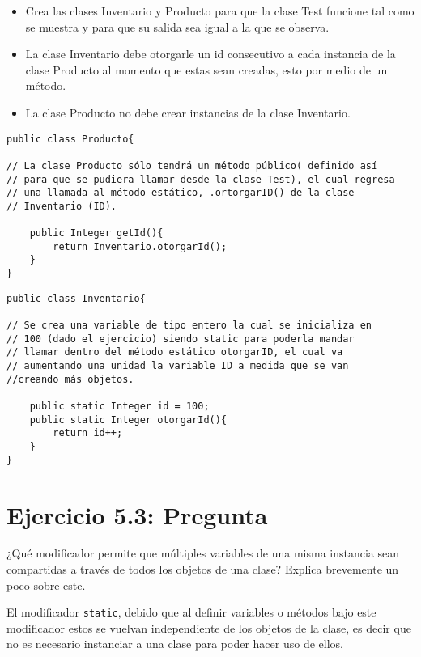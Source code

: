 \documentclass[11pt, oneside]{article}
\begin{document}
\begin{itemize}
	\item Crea las clases Inventario y Producto para que la clase Test funcione tal como se
muestra y para que su salida sea igual a la que se observa.
	\item La clase Inventario debe otorgarle un id consecutivo a cada instancia de la clase
Producto al momento que estas sean creadas, esto por medio de un método.
	\item La clase Producto no debe crear instancias de la clase Inventario.
\end{itemize}


\begin{verbatim}
public class Producto{

// La clase Producto sólo tendrá un método público( definido así
// para que se pudiera llamar desde la clase Test), el cual regresa 
// una llamada al método estático, .ortorgarID() de la clase 
// Inventario (ID).

	public Integer getId(){
		return Inventario.otorgarId(); 
	}
}
\end{verbatim}

\begin{verbatim}
public class Inventario{
	
// Se crea una variable de tipo entero la cual se inicializa en 
// 100 (dado el ejercicio) siendo static para poderla mandar 
// llamar dentro del método estático otorgarID, el cual va 
// aumentando una unidad la variable ID a medida que se van 
//creando más objetos.

	public static Integer id = 100;
	public static Integer otorgarId(){
		return id++;
	}
}
\end{verbatim}

\section*{Ejercicio 5.3: Pregunta}

\noindent ¿Qué modificador permite que múltiples variables de una misma instancia sean compartidas a través de todos los objetos de una clase? Explica brevemente un poco sobre este.

El modificador {\tt static}, debido que al definir variables o métodos bajo este modificador estos se vuelvan independiente de los objetos de la clase, es decir que no es necesario instanciar a una clase para poder hacer uso de ellos.
\end{document}
